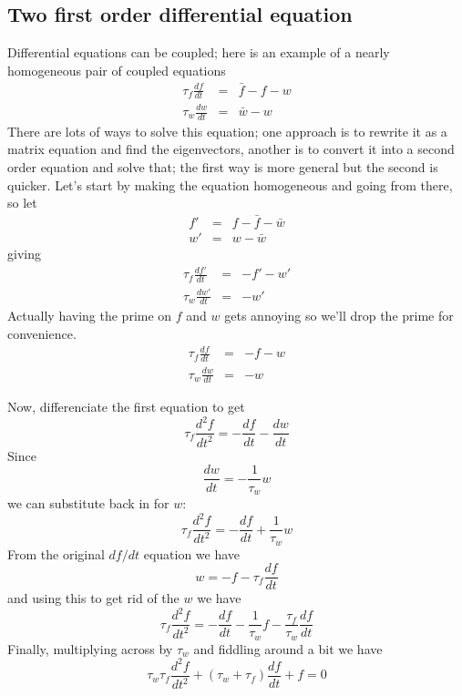 \documentclass{article}
\begin{document}
\subsection*{Two first order differential equation}

Differential equations can be coupled; here is an example of a nearly homogeneous pair of coupled equations
\begin{eqnarray}
\tau_f \frac{df}{dt}&=&\bar{f}-f-w\\
\tau_w \frac{dw}{dt}&=&\bar{w}-w
\end{eqnarray}
There are lots of ways to solve this equation; one approach is to
rewrite it as a matrix equation and find the eigenvectors, another is
to convert it into a second order equation and solve that; the first
way is more general but the second is quicker. Let's start by making
the equation homogeneous and going from there, so let
\begin{eqnarray}
f'&=&f-\bar{f}-\bar{w}\\
w'&=&w-\bar{w}
\end{eqnarray}
giving
\begin{eqnarray}
\tau_f \frac{df'}{dt}&=&-f'-w'\\
\tau_w \frac{dw'}{dt}&=&-w'
\end{eqnarray}
Actually having the prime on $f$ and $w$ gets annoying so we'll drop the prime for convenience.
\begin{eqnarray}
\tau_f \frac{df}{dt}&=&-f-w\\
\tau_w \frac{dw}{dt}&=&-w
\end{eqnarray}

Now, differenciate the first equation to get
\begin{equation}
\tau_f \frac{d^2f}{dt^2}=-\frac{df}{dt}-\frac{dw}{dt}
\end{equation}
Since 
\begin{equation}
\frac{dw}{dt}=-\frac{1}{\tau_w}w
\end{equation}
we can substitute back in for $w$:
\begin{equation}
\tau_f \frac{d^2f}{dt^2}=-\frac{df}{dt}+\frac{1}{\tau_w}w
\end{equation}
From the original $df/dt$ equation we have
\begin{equation}
w=-f-\tau_f \frac{df}{dt}
\end{equation}
and using this to get rid of the $w$ we have
\begin{equation}
\tau_f \frac{d^2f}{dt^2}=-\frac{df}{dt}-\frac{1}{\tau_w}f-\frac{\tau_f}{\tau_w}\frac{df}{dt}
\end{equation}
Finally, multiplying across by $\tau_w$ and fiddling around a bit we have
\begin{equation}
\tau_w\tau_f \frac{d^2f}{dt^2}+(\tau_w+\tau_f)\frac{df}{dt}+f=0
\end{equation}
\end{document}
